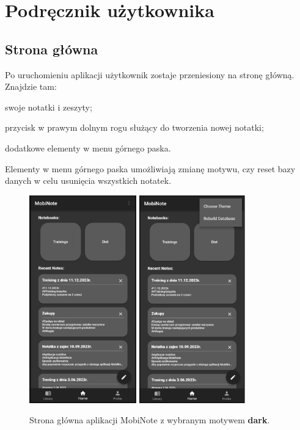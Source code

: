 \chapter{Podręcznik użytkownika}
\label{ch:manual}

\section{Strona główna}

Po uruchomieniu aplikacji użytkownik zostaje przeniesiony na stronę główną. Znajdzie tam:
\begin{compactitem}
    \item swoje notatki i zeszyty;
    \item przycisk w prawym dolnym rogu służący do tworzenia nowej notatki;
    \item dodatkowe elementy w menu górnego paska.
\end{compactitem}
Elementy w menu górnego paska umożliwiają zmianę motywu, czy reset bazy danych w celu usunięcia wszystkich notatek. 

\begin{figure}[ht]
    \centering
    \includegraphics[height=9cm]{images/strona_domowa.png}
    \quad\quad
    \includegraphics[height=9cm]{images/strona_domowa_opcje.png}
    \caption{Strona główna aplikacji MobiNote z wybranym motywem \textbf{dark}.}
\end{figure}

